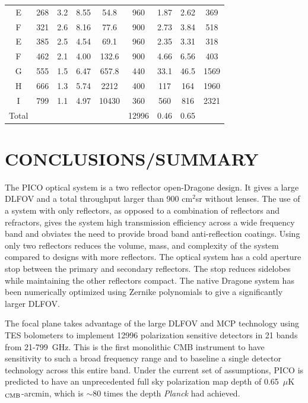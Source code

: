 \documentclass[]{spie}  %
\begin{document}
\begin{table}[ht]
\begin{tabular}{|c|c|c|c|c|c|c|cc|}
E        & 268 & 3.2  & 8.55   & 54.8    & 960   & 1.87   & 2.62 & 369    \\
F        & 321 & 2.6  & 8.16   & 77.6    & 900   & 2.73   & 3.84 & 518    \\
E        & 385 & 2.5  & 4.54   & 69.1    & 960   & 2.35   & 3.31 & 318    \\
F        & 462 & 2.1  & 4.00    & 132.6   & 900   & 4.66   & 6.56 & 403    \\
G        & 555 & 1.5  & 6.47   & 657.8   & 440   & 33.1   & 46.5 & 1569  \\
H        & 666 & 1.3  & 5.74   & 2212    & 400   & 117    & 164  & 1960 \\
I          & 799 & 1.1  & 4.97     & 10430   & 360   & 560    & 816  & 2321 \\ 
\hline
Total   &     &      &       &         & 12996 & 0.46   & 0.65 &   \\
\hline
\end{tabular}
\end{table}

\section{CONCLUSIONS/SUMMARY}

The PICO optical system is a two reflector open-Dragone design. It gives a large DLFOV and a total 
throughput larger than 900 cm$^{2}$sr without lenses. The use of a system 
with only reflectors, as opposed to a combination of reflectors and refractors, gives the system high transmission efficiency 
across a wide frequency band and obviates the need to provide broad band anti-reflection coatings. 
Using only two reflectors reduces the volume, mass, and complexity of the system compared to designs with more 
reflectors. The optical system has a cold aperture stop between the primary and secondary reflectors. The stop 
reduces sidelobes while maintaining the other reflectors compact. The native Dragone system has been 
numerically optimized using Zernike polynomials to give a significantly larger DLFOV. 

The focal plane takes advantage of the large DLFOV and MCP 
technology using TES bolometers to implement 12996 polarization sensitive detectors in 21 bands from 21-799~GHz. 
This is the first monolithic CMB instrument to have sensitivity to such a broad frequency range and to baseline a single detector technology 
across this entire band. Under the current set of assumptions, PICO is predicted to have an unprecedented full sky polarization 
map depth of 0.65~$\mu$K$_{\rm CMB}$-arcmin, which is $\sim$80 times the depth {\it Planck} had achieved. 
\end{document}
